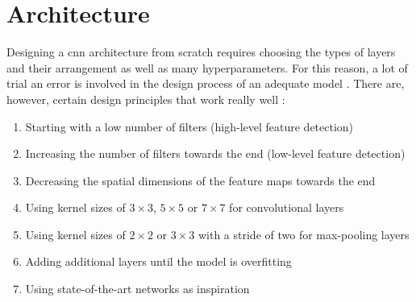 \section{Architecture}
\label{sec:training_of_the_cnn:architecture}

Designing a \acrlong{cnn} architecture from scratch requires choosing the types of layers and their arrangement as well as many hyperparameters.
For this reason, a lot of trial an error is involved in the design process of an adequate model \cite{}. %
There are, however, certain design principles that work really well \cite{}: %

\begin{enumerate}
  \item Starting with a low number of filters (high-level feature detection)
  \item Increasing the number of filters towards the end (low-level feature detection)
  \item Decreasing the spatial dimensions of the feature maps towards the end
  \item Using kernel sizes of $3\times 3$, $5\times 5$ or $7\times 7$ for convolutional layers
  \item Using kernel sizes of $2\times 2$ or $3\times 3$ with a stride of two for max-pooling layers
  \item Adding additional layers until the model is overfitting
  \item Using state-of-the-art networks as inspiration
\end{enumerate}

